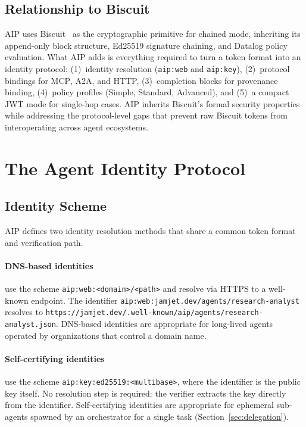 \documentclass[11pt,a4paper]{article}
\newcommand{\aip}{\textsc{AIP}}
\newcommand{\atoa}{\textsc{A2A}}
\newcommand{\mcp}{\textsc{MCP}}
\begin{document}
\subsection{Relationship to Biscuit}
\label{sec:biscuit-delta}

\aip{} uses Biscuit~\citep{biscuit2024spec} as the cryptographic primitive for chained mode, inheriting its append-only block structure, Ed25519 signature chaining, and Datalog policy evaluation. What \aip{} adds is everything required to turn a token format into an identity protocol: (1)~identity resolution (\texttt{aip:web} and \texttt{aip:key}), (2)~protocol bindings for \mcp{}, \atoa{}, and HTTP, (3)~completion blocks for provenance binding, (4)~policy profiles (Simple, Standard, Advanced), and (5)~a compact JWT mode for single-hop cases. \aip{} inherits Biscuit's formal security properties while addressing the protocol-level gaps that prevent raw Biscuit tokens from interoperating across agent ecosystems.

\section{The Agent Identity Protocol}
\label{sec:protocol}

\subsection{Identity Scheme}
\label{sec:identity}

\aip{} defines two identity resolution methods that share a common token format and verification path.

\paragraph{DNS-based identities} use the scheme \texttt{aip:web:<domain>/<path>} and resolve via HTTPS to a well-known endpoint. The identifier \texttt{aip:web:jamjet.dev/agents/research-analyst} resolves to \texttt{https://jamjet.dev/.well-known/aip/agents/research-analyst.json}. DNS-based identities are appropriate for long-lived agents operated by organizations that control a domain name.

\paragraph{Self-certifying identities} use the scheme \texttt{aip:key:ed25519:<multibase>}, where the identifier is the public key itself. No resolution step is required: the verifier extracts the key directly from the identifier. Self-certifying identities are appropriate for ephemeral sub-agents spawned by an orchestrator for a single task (Section~\ref{sec:delegation}).
\end{document}
